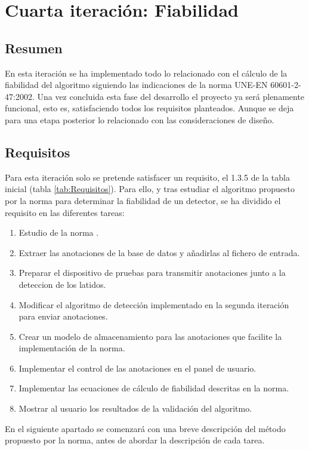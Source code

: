 
\section{Cuarta iteración: Fiabilidad}
    \subsection{Resumen}
        
        En esta iteración se ha implementado todo lo relacionado con el cálculo de la fiabilidad del algoritmo siguiendo las indicaciones de la norma UNE-EN 60601-2-47:2002. Una vez concluida esta fase del desarrollo el proyecto ya será plenamente funcional, esto es, satisfaciendo todos los requisitos planteados. Aunque se deja para una etapa posterior lo relacionado con las consideraciones de diseño.
        
    \subsection{Requisitos}
    
        Para esta iteración solo se pretende satisfacer un requisito, el 1.3.5 de la tabla inicial (tabla \ref{tab:Requisitos}). Para ello, y tras estudiar el algoritmo propuesto por la norma para determinar la fiabilidad de un detector, se ha dividido el requisito en las diferentes tareas:
        
        \begin{enumerate}
            \item Estudio de la norma \cite{Aenor2002}.
            \item Extraer las anotaciones de la base de datos y añadirlas al fichero de entrada.
            \item Preparar el dispositivo de pruebas para transmitir anotaciones junto a la deteccion de los latidos.
            \item Modificar el algoritmo de detección implementado en la segunda iteración para enviar anotaciones.
            \item Crear un modelo de almacenamiento para las anotaciones que facilite la implementación de la norma. \cite{Aenor2002}
            \item Implementar el control de las anotaciones en el panel de usuario.
            \item Implementar las ecuaciones de cálculo de fiabilidad descritas en la norma. \cite{Aenor2002}
            \item Mostrar al usuario los resultados de la validación del algoritmo.
        \end{enumerate}
    En el siguiente apartado se comenzará con una breve descripción del método propuesto por la norma, antes de abordar la descripción de cada tarea. 
    
